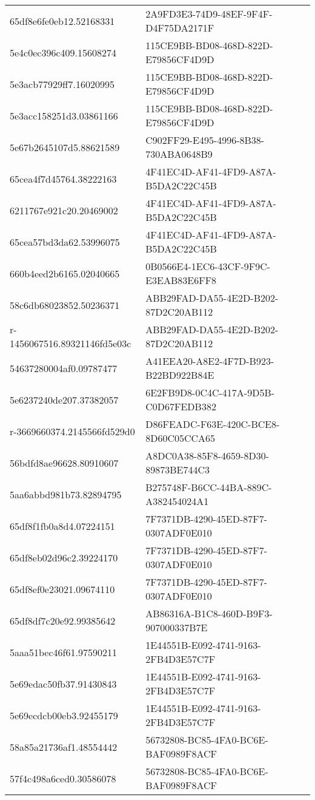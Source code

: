 \begin{tabular}{ll}
65df8e6fe0eb12.52168331 & 2A9FD3E3-74D9-48EF-9F4F-D4F75DA2171F \\
5e4c0ec396c409.15608274 & 115CE9BB-BD08-468D-822D-E79856CF4D9D \\
5e3acb77929ff7.16020995 & 115CE9BB-BD08-468D-822D-E79856CF4D9D \\
5e3acc158251d3.03861166 & 115CE9BB-BD08-468D-822D-E79856CF4D9D \\
5e67b2645107d5.88621589 & C902FF29-E495-4996-8B38-730ABA0648B9 \\
65cea4f7d45764.38222163 & 4F41EC4D-AF41-4FD9-A87A-B5DA2C22C45B \\
6211767e921c20.20469002 & 4F41EC4D-AF41-4FD9-A87A-B5DA2C22C45B \\
65cea57bd3da62.53996075 & 4F41EC4D-AF41-4FD9-A87A-B5DA2C22C45B \\
660b4eed2b6165.02040665 & 0B0566E4-1EC6-43CF-9F9C-E3EAB83E6FF8 \\
58c6db68023852.50236371 & ABB29FAD-DA55-4E2D-B202-87D2C20AB112 \\
r-1456067516.89321146fd5e03c & ABB29FAD-DA55-4E2D-B202-87D2C20AB112 \\
54637280004af0.09787477 & A41EEA20-A8E2-4F7D-B923-B22BD922B84E \\
5e6237240de207.37382057 & 6E2FB9D8-0C4C-417A-9D5B-C0D67FEDB382 \\
r-3669660374.2145566fd529d0 & D86FEADC-F63E-420C-BCE8-8D60C05CCA65 \\
56bdfd8ae96628.80910607 & A8DC0A38-85F8-4659-8D30-89873BE744C3 \\
5aa6abbd981b73.82894795 & B275748F-B6CC-44BA-889C-A382454024A1 \\
65df8f1fb0a8d4.07224151 & 7F7371DB-4290-45ED-87F7-0307ADF0E010 \\
65df8eb02d96c2.39224170 & 7F7371DB-4290-45ED-87F7-0307ADF0E010 \\
65df8ef0e23021.09674110 & 7F7371DB-4290-45ED-87F7-0307ADF0E010 \\
65df8df7c20e92.99385642 & AB86316A-B1C8-460D-B9F3-907000337B7E \\
5aaa51bec46f61.97590211 & 1E44551B-E092-4741-9163-2FB4D3E57C7F \\
5e69edac50fb37.91430843 & 1E44551B-E092-4741-9163-2FB4D3E57C7F \\
5e69ecdcb00eb3.92455179 & 1E44551B-E092-4741-9163-2FB4D3E57C7F \\
58a85a21736af1.48554442 & 56732808-BC85-4FA0-BC6E-BAF0989F8ACF \\
57f4c498a6ced0.30586078 & 56732808-BC85-4FA0-BC6E-BAF0989F8ACF \\

\end{tabular}
